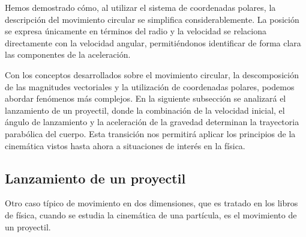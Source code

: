 Hemos demostrado cómo, al utilizar el sistema de coordenadas polares, la descripción del movimiento circular se simplifica considerablemente. La posición se expresa únicamente en términos del radio y la velocidad se relaciona directamente con la velocidad angular, permitiéndonos identificar de forma clara las componentes de la aceleración.

Con los conceptos desarrollados sobre el movimiento circular, la descomposición de las magnitudes vectoriales y la utilización de coordenadas polares, podemos abordar fenómenos más complejos. En la siguiente subsección se analizará el lanzamiento de un proyectil, donde la combinación de la velocidad inicial, el ángulo de lanzamiento y la aceleración de la gravedad determinan la trayectoria parabólica del cuerpo. Esta transición nos permitirá aplicar los principios de la cinemática vistos hasta ahora a situaciones de interés en la física.

\subsection{Lanzamiento de un proyectil}

Otro caso típico de movimiento en dos dimensiones, que es tratado en los libros de física, cuando se estudia la cinemática de una partícula, es el movimiento de un proyectil.

